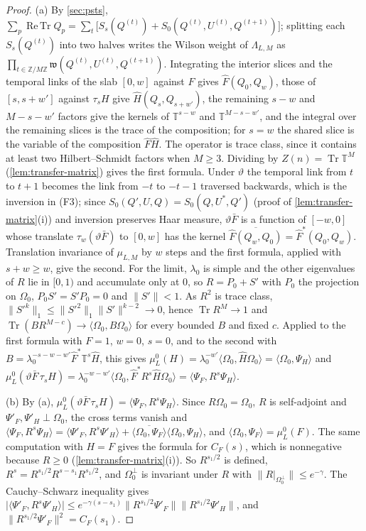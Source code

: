 \documentclass[11pt,a4paper]{amsart}
\theoremstyle{definition}
\theoremstyle{remark}
\numberwithin{equation}{section}
\DeclareMathOperator{\Tr}{Tr}        %
\DeclareMathOperator{\ReTr}{Re\,Tr}  %
\newcommand{\Z}{\mathbb{Z}}          %
\newcommand{\ip}[2]{\langle #1,#2\rangle}  %
\newcommand{\norm}[1]{\lVert #1\rVert}     %
\newcommand{\abs}[1]{\lvert #1\rvert}      %
\newcommand{\TT}{\mathbb{T}}               %
\newcommand{\lzero}{\lambda_0}             %
\newcommand{\Omegazero}{\Omega_0}          %
\begin{document}
\begin{proof}
(a) By \cref{sec:psts}, $\sum_p\ReTr Q_p=\sum_t\bigl[S_s(Q^{(t)})+S_0(Q^{(t)},U^{(t)},Q^{(t+1)})\bigr]$; splitting each $S_s(Q^{(t)})$ into two halves writes the Wilson weight of $\Lambda_{L,M}$ as $\prod_{t\in\Z/M\Z}\mathfrak w(Q^{(t)},U^{(t)},Q^{(t+1)})$. Integrating the interior slices and the temporal links of the slab $[0,w]$ against $F$ gives $\hat F(Q_0,Q_w)$, those of $[s,s+w']$ against $\tau_sH$ give $\hat H(Q_s,Q_{s+w'})$, the remaining $s-w$ and $M-s-w'$ factors give the kernels of $\TT^{s-w}$ and $\TT^{M-s-w'}$, and the integral over the remaining slices is the trace of the composition; for $s=w$ the shared slice is the variable of the composition $\hat F\hat H$. The operator is trace class, since it contains at least two Hilbert--Schmidt factors when $M\ge3$. Dividing by $Z(n)=\Tr\TT^M$ (\cref{lem:transfer-matrix}) gives the first formula. Under $\vartheta$ the temporal link from $t$ to $t+1$ becomes the link from $-t$ to $-t-1$ traversed backwards, which is the inversion in (F3); since $S_0(Q',U,Q)=S_0(Q,U^*,Q')$ (proof of \cref{lem:transfer-matrix}(i)) and inversion preserves Haar measure, $\vartheta\bar F$ is a function of $[-w,0]$ whose translate $\tau_w(\vartheta\bar F)$ to $[0,w]$ has the kernel $\overline{\hat F(Q_w,Q_0)}=\hat F^*(Q_0,Q_w)$. Translation invariance of $\mu_{L,M}$ by $w$ steps and the first formula, applied with $s+w\ge w$, give the second. For the limit, $\lzero$ is simple and the other eigenvalues of $R$ lie in $[0,1)$ and accumulate only at $0$, so $R=P_0+S'$ with $P_0$ the projection on $\Omegazero$, $P_0S'=S'P_0=0$ and $\norm{S'}<1$. As $R^2$ is trace class, $\norm{S'^k}_1\le\norm{S'^2}_1\norm{S'}^{k-2}\to0$, hence $\Tr R^M\to1$ and $\Tr(BR^{M-c})\to\ip{\Omegazero}{B\Omegazero}$ for every bounded $B$ and fixed $c$. Applied to the first formula with $F=1$, $w=0$, $s=0$, and to the second with $B=\lzero^{-s-w-w'}\hat F^*\TT^s\hat H$, this gives $\mu^0_L(H)=\lzero^{-w'}\ip{\Omegazero}{\hat H\Omegazero}=\ip{\Omegazero}{\Psi_H}$ and $\mu^0_L(\vartheta\bar F\,\tau_sH)=\lzero^{-w-w'}\ip{\Omegazero}{\hat F^*R^s\hat H\Omegazero}=\ip{\Psi_F}{R^s\Psi_H}$.

(b) By (a), $\mu^0_L(\vartheta\bar F\,\tau_sH)=\ip{\Psi_F}{R^s\Psi_H}$. Since $R\Omegazero=\Omegazero$, $R$ is self-adjoint and $\Psi'_F,\Psi'_H\perp\Omegazero$, the cross terms vanish and $\ip{\Psi_F}{R^s\Psi_H}=\ip{\Psi'_F}{R^s\Psi'_H}+\overline{\ip{\Omegazero}{\Psi_F}}\ip{\Omegazero}{\Psi_H}$, and $\ip{\Omegazero}{\Psi_F}=\mu^0_L(F)$. The same computation with $H=F$ gives the formula for $C_F(s)$, which is nonnegative because $R\ge0$ (\cref{lem:transfer-matrix}(i)). So $R^{s_1/2}$ is defined, $R^s=R^{s_1/2}R^{s-s_1}R^{s_1/2}$, and $\Omegazero^\perp$ is invariant under $R$ with $\norm{R|_{\Omegazero^\perp}}\le e^{-\gamma}$. The Cauchy--Schwarz inequality gives $\abs{\ip{\Psi'_F}{R^s\Psi'_H}}\le e^{-\gamma(s-s_1)}\norm{R^{s_1/2}\Psi'_F}\norm{R^{s_1/2}\Psi'_H}$, and $\norm{R^{s_1/2}\Psi'_F}^2=C_F(s_1)$.


\end{proof}
\end{document}
